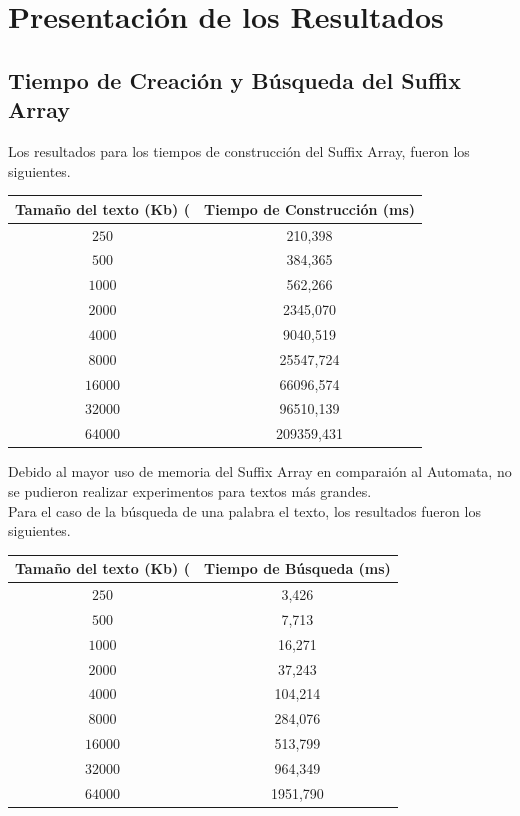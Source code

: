 \documentclass[letterpaper,10pt]{article}
\begin{document}
	\section{Presentación de los Resultados}

	\subsection{Tiempo de Creación y Búsqueda del Suffix Array}

	Los resultados para los tiempos de construcción del Suffix Array, fueron los siguientes.

	\begin{center}
		\begin{tabular}{|c|c|}
			\hline
			Tamaño del texto (Kb) ( & Tiempo de Construcción (ms)\\
			\hline
			$250$ & 210,398\\
			\hline
			$500$ & 384,365\\
			\hline
			$1000$ & 562,266\\
			\hline
			$2000$ & 2345,070\\
			\hline
			$4000$ & 9040,519\\
			\hline
			$8000$ & 25547,724\\
			\hline
			$16000$ & 66096,574\\
			\hline
			$32000$ & 96510,139\\
			\hline
			$64000$ & 209359,431\\
			\hline
		\end{tabular}
	\end{center}
	
	Debido al mayor uso de memoria del Suffix Array en comparaión al Automata, no se pudieron realizar experimentos para textos más grandes.\\
	
	Para el caso de la búsqueda de una palabra el texto, los resultados fueron los siguientes.
	
	\begin{center}
		\begin{tabular}{|c|c|}
			\hline
			Tamaño del texto (Kb) ( & Tiempo de Búsqueda (ms)\\
			\hline
			$250$ & 3,426\\
			\hline
			$500$ & 7,713\\
			\hline
			$1000$ & 16,271\\
			\hline
			$2000$ & 37,243\\
			\hline
			$4000$ & 104,214\\
			\hline
			$8000$ & 284,076\\
			\hline
			$16000$ & 513,799\\
			\hline
			$32000$ & 964,349\\
			\hline
			$64000$ & 1951,790\\
			\hline
		\end{tabular}
	\end{center}
	
\end{document}
